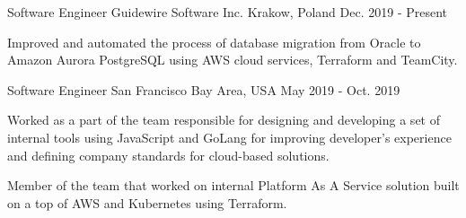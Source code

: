 

\begin{cventries}

  \cventry
    {Software Engineer} %
    {Guidewire Software Inc.} %
    {Krakow, Poland} %
    {Dec. 2019 - Present} %
    {
      \begin{cvitems} %
        \item {Improved and automated the process of database migration from Oracle to Amazon Aurora PostgreSQL using AWS cloud services, Terraform and TeamCity.}
      \end{cvitems}
    }

  \cventry
    {Software Engineer} %
    {} %
    {San Francisco Bay Area, USA} %
    {May 2019 - Oct. 2019} %
    {
      \begin{cvitems} %
        \item {Worked as a part of the team responsible for designing and developing a set of internal tools using JavaScript and GoLang for improving developer's experience and defining company standards for cloud-based solutions.}
        \item {Member of the team that worked on internal Platform As A Service solution built on a top of AWS and Kubernetes using Terraform. }
      \end{cvitems}
    }


\end{cventries}

